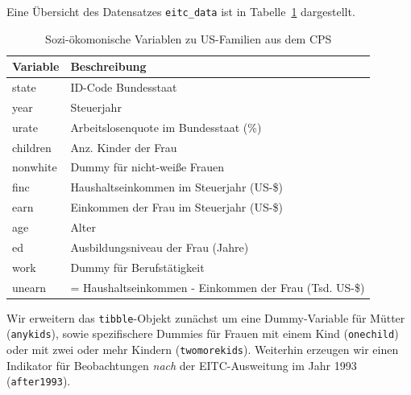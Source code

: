 \documentclass[
  a4paper,
  DIV=11,
  oneside]{scrreprt}
\begin{document}
Eine Übersicht des Datensatzes \texttt{eitc\_data} ist in
Tabelle~\ref{tbl-EITCdata} dargestellt.

\begingroup
\fontsize{12.0pt}{14.4pt}\selectfont

\begin{longtable}{ll}

\caption{\label{tbl-EITCdata}Sozi-ökomonische Variablen zu US-Familien
aus dem CPS}

\tabularnewline

\toprule
Variable & Beschreibung \\ 
\midrule\addlinespace[2.5pt]
state & ID-Code Bundesstaat \\ 
year & Steuerjahr \\ 
urate & Arbeitslosenquote im Bundesstaat (\%) \\ 
children & Anz. Kinder der Frau \\ 
nonwhite & Dummy für nicht-weiße Frauen \\ 
finc & Haushaltseinkommen im Steuerjahr (US-\$) \\ 
earn & Einkommen der Frau im Steuerjahr (US-\$) \\ 
age & Alter \\ 
ed & Ausbildungsniveau der Frau (Jahre) \\ 
work & Dummy für Berufstätigkeit \\ 
unearn & = Haushaltseinkommen - Einkommen der Frau (Tsd. US-\$)  \\ 
\bottomrule

\end{longtable}

\endgroup

Wir erweitern das \texttt{tibble}-Objekt zunächst um eine Dummy-Variable
für Mütter (\texttt{anykids}), sowie spezifischere Dummies für Frauen
mit einem Kind (\texttt{onechild}) oder mit zwei oder mehr Kindern
(\texttt{twomorekids}). Weiterhin erzeugen wir einen Indikator für
Beobachtungen \emph{nach} der EITC-Ausweitung im Jahr 1993
(\texttt{after1993}).
\end{document}
